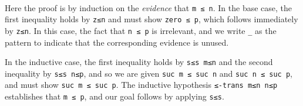 \begin{fence}
\begin{code}%
\>[0]\AgdaSpace{}%
\AgdaSymbol{:}\AgdaSpace{}%
\AgdaSpace{}%
\AgdaSymbol{\{}\AgdaSpace{}%
\AgdaSpace{}%
\AgdaSpace{}%
\AgdaSymbol{:}\AgdaSpace{}%
\AgdaSymbol{\}}\<%
\\
\>[0][@{}l@{\AgdaIndent{0}}]%
\>[2]\AgdaSpace{}%
\AgdaSpace{}%
\AgdaSpace{}%
\<%
\\
%
\>[2]%
\>[184I]\AgdaSpace{}%
\AgdaSpace{}%
\<%
\\
\>[.][@{}l@{}]\<[184I]%
\>[4]\AgdaComment{-----}\<%
\\
%
\>[2]\AgdaSpace{}%
\AgdaSpace{}%
\AgdaSpace{}%
\<%
\\
\>[0]\AgdaSpace{}%
%
\>[18]\AgdaSymbol{\AgdaUnderscore{}}%
\>[29]\AgdaSymbol{=}%
\>[32]\<%
\\
\>[0]\AgdaSpace{}%
\AgdaSymbol{(}\AgdaSpace{}%
\AgdaSymbol{)}\AgdaSpace{}%
\AgdaSymbol{(}\AgdaSpace{}%
\AgdaSymbol{)}%
\>[29]\AgdaSymbol{=}%
\>[32]\AgdaSpace{}%
\AgdaSymbol{(}\AgdaSpace{}%
\AgdaSpace{}%
\AgdaSymbol{)}\<%
\end{code}
\end{fence}

Here the proof is by induction on the \emph{evidence} that
\texttt{m\ ≤\ n}. In the base case, the first inequality holds by
\texttt{z≤n} and must show \texttt{zero\ ≤\ p}, which follows
immediately by \texttt{z≤n}. In this case, the fact that
\texttt{n\ ≤\ p} is irrelevant, and we write \texttt{\_} as the pattern
to indicate that the corresponding evidence is unused.

In the inductive case, the first inequality holds by \texttt{s≤s\ m≤n}
and the second inequality by \texttt{s≤s\ n≤p}, and so we are given
\texttt{suc\ m\ ≤\ suc\ n} and \texttt{suc\ n\ ≤\ suc\ p}, and must show
\texttt{suc\ m\ ≤\ suc\ p}. The inductive hypothesis
\texttt{≤-trans\ m≤n\ n≤p} establishes that \texttt{m\ ≤\ p}, and our
goal follows by applying \texttt{s≤s}.

